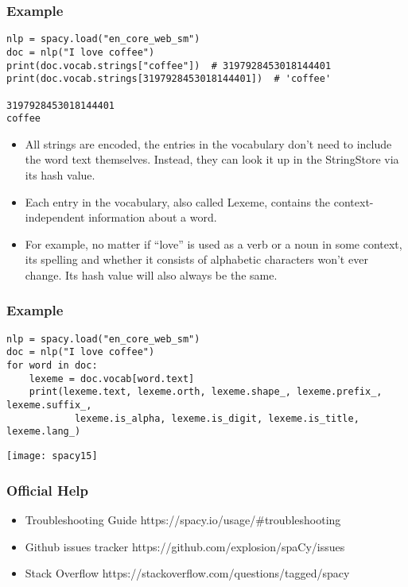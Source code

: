 \begin{frame}[fragile]\frametitle{Example}

\begin{lstlisting}
nlp = spacy.load("en_core_web_sm")
doc = nlp("I love coffee")
print(doc.vocab.strings["coffee"])  # 3197928453018144401
print(doc.vocab.strings[3197928453018144401])  # 'coffee'

3197928453018144401
coffee
\end{lstlisting}

  \begin{itemize}
    \item All strings are encoded, the entries in the vocabulary don’t need to include the word text themselves. Instead, they can look it up in the StringStore via its hash value. 
		\item Each entry in the vocabulary, also called Lexeme, contains the context-independent information about a word. 
		\item For example, no matter if “love” is used as a verb or a noun in some context, its spelling and whether it consists of alphabetic characters won’t ever change. Its hash value will also always be the same.
  \end{itemize}


\end{frame}

\begin{frame}[fragile]\frametitle{Example}

\begin{lstlisting}
nlp = spacy.load("en_core_web_sm")
doc = nlp("I love coffee")
for word in doc:
    lexeme = doc.vocab[word.text]
    print(lexeme.text, lexeme.orth, lexeme.shape_, lexeme.prefix_, lexeme.suffix_,
            lexeme.is_alpha, lexeme.is_digit, lexeme.is_title, lexeme.lang_)
\end{lstlisting}

	\begin{center}
\texttt{[image: spacy15]}
\end{center}


\end{frame}

\begin{frame}[fragile]\frametitle{Official Help}
  \begin{itemize}
    \item Troubleshooting Guide https://spacy.io/usage/\#troubleshooting
		\item Github issues tracker https://github.com/explosion/spaCy/issues
		\item Stack Overflow  https://stackoverflow.com/questions/tagged/spacy
  \end{itemize}
	
	
\end{frame}